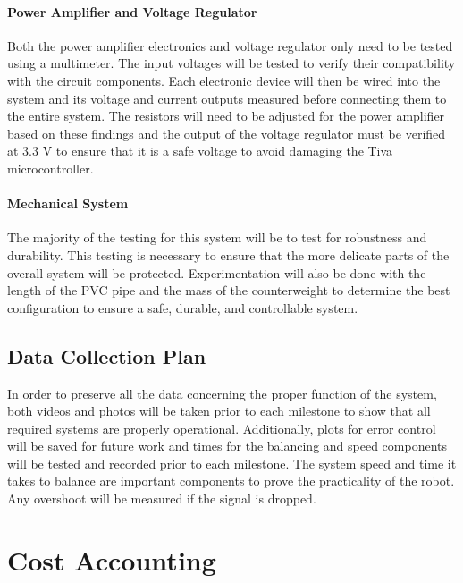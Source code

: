 \documentclass[11pt]{report}
\begin{document}
\begin{spacing}{1.5}
\paragraph*{Power Amplifier and Voltage Regulator}
Both the power amplifier electronics and voltage regulator only need to be tested using a multimeter. The input voltages will be tested to verify their compatibility with the circuit components. Each electronic device will then be wired into the system and its voltage and current outputs measured before connecting them to the entire system. The resistors will need to be adjusted for the power amplifier based on these findings and the output of the voltage regulator must be verified at 3.3 V to ensure that it is a safe voltage to avoid damaging the Tiva microcontroller.

\paragraph*{Mechanical System}
The majority of the testing for this system will be to test for robustness and durability.  This testing is necessary to ensure that the more delicate parts of the overall system will be protected.  Experimentation will also be done with the length of the PVC pipe and the mass of the counterweight to determine the best configuration to ensure a safe, durable, and controllable system.

\subsection*{Data Collection Plan}

In order to preserve all the data concerning the proper function of the system, both videos and photos will be taken prior to each milestone to show that all required systems are properly operational. Additionally, plots for error control will be saved for future work and times for the balancing and speed components will be tested and recorded prior to each milestone. The system speed and time it takes to balance are important components to prove the practicality of the robot. Any overshoot will be measured if the signal is dropped.

\section*{Cost Accounting} %


\end{spacing}
\end{document}
